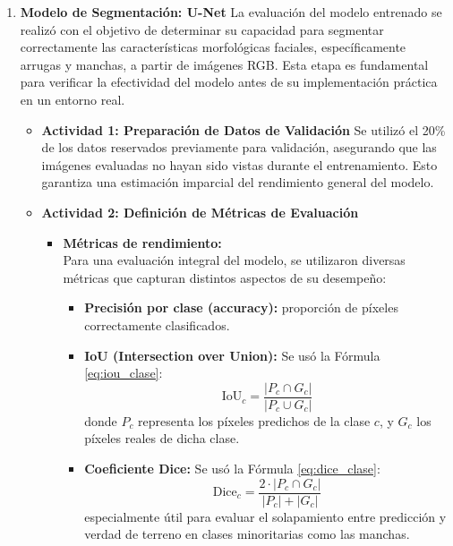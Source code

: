 \begin{enumerate}
  \item \textbf{Modelo de Segmentación: U-Net}
  La evaluación del modelo entrenado se realizó con el objetivo de determinar su capacidad para segmentar correctamente las características morfológicas faciales, específicamente arrugas y manchas, a partir de imágenes RGB. Esta etapa es fundamental para verificar la efectividad del modelo antes de su implementación práctica en un entorno real.

  \begin{itemize}
  \item\textbf{Actividad 1: Preparación de Datos de Validación}
  Se utilizó el 20\% de los datos reservados previamente para validación, asegurando que las imágenes evaluadas no hayan sido vistas durante el entrenamiento. Esto garantiza una estimación imparcial del rendimiento general del modelo.

  \item\textbf{Actividad 2: Definición de Métricas de Evaluación}
  \begin{itemize}
  
  
    \item \textbf{Métricas de rendimiento:}\\
    Para una evaluación integral del modelo, se utilizaron diversas métricas que capturan distintos aspectos de su desempeño:
    \begin{itemize}
      \item \textbf{Precisión por clase (accuracy):} proporción de píxeles correctamente clasificados.
      \item \textbf{IoU (Intersection over Union):}
      Se usó la Fórmula \ref{eq:iou_clase}:
      \begin{equation}\label{eq:iou_clase}
        \text{IoU}_c = \frac{|P_c \cap G_c|}{|P_c \cup G_c|}
    \end{equation}
      donde $P_c$ representa los píxeles predichos de la clase $c$, y $G_c$ los píxeles reales de dicha clase.
  
      \item \textbf{Coeficiente Dice:}
      Se usó la Fórmula \ref{eq:dice_clase}:
      \begin{equation}\label{eq:dice_clase}
        \text{Dice}_c = \frac{2 \cdot |P_c \cap G_c|}{|P_c| + |G_c|}
    \end{equation}
      especialmente útil para evaluar el solapamiento entre predicción y verdad de terreno en clases minoritarias como las manchas.
  

\end{itemize}
\end{itemize}
\end{itemize}
\end{enumerate}
